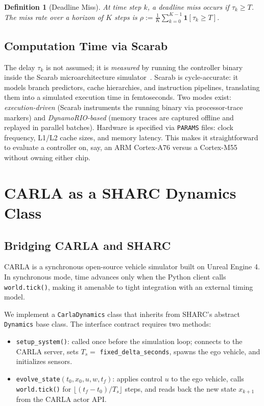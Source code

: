 \documentclass[conference]{IEEEtran}
\newtheorem{definition}{Definition}
\begin{document}
\begin{definition}[Deadline Miss]\label{def:miss}
  At time step $k$, a \emph{deadline miss} occurs if $\tau_k \geq T$.
  The \emph{miss rate} over a horizon of $K$ steps is
  $\rho := \frac{1}{K}\sum_{k=0}^{K-1}\mathbf{1}[\tau_k \geq T]$.
\end{definition}

\subsection{Computation Time via Scarab}

The delay $\tau_k$ is not assumed; it is \emph{measured} by running the
controller binary inside the Scarab microarchitecture
simulator~\cite{scarab}.  Scarab is cycle-accurate: it models branch
predictors, cache hierarchies, and instruction pipelines, translating
them into a simulated execution time in femtoseconds.  Two modes exist:
\emph{execution-driven} (Scarab instruments the running binary via
processor-trace markers) and \emph{DynamoRIO-based} (memory traces are
captured offline and replayed in parallel batches).  Hardware is
specified via \texttt{PARAMS} files: clock frequency, L1/L2 cache
sizes, and memory latency.  This makes it straightforward to evaluate a
controller on, say, an ARM Cortex-A76 versus a Cortex-M55 without
owning either chip.

\section{CARLA as a SHARC Dynamics Class}\label{sec:carla_dyn}

\subsection{Bridging CARLA and SHARC}

CARLA is a synchronous open-source vehicle simulator built on Unreal
Engine 4.  In synchronous mode, time advances only when the Python
client calls \texttt{world.tick()}, making it amenable to tight
integration with an external timing model.

We implement a \texttt{CarlaDynamics} class that inherits from
SHARC's abstract \texttt{Dynamics} base class.  The interface contract
requires two methods:
\begin{itemize}
  \item \texttt{setup\_system()}: called once before the simulation loop;
    connects to the CARLA server, sets $T_s =$ \texttt{fixed\_delta\_seconds},
    spawns the ego vehicle, and initializes sensors.
  \item \texttt{evolve\_state}$(t_0, x_0, u, w, t_f)$: applies control
    $u$ to the ego vehicle, calls \texttt{world.tick()} for
    $\lfloor(t_f - t_0)/T_s\rfloor$ steps, and reads back
    the new state $x_{k+1}$ from the CARLA actor API.
\end{itemize}
\end{document}
